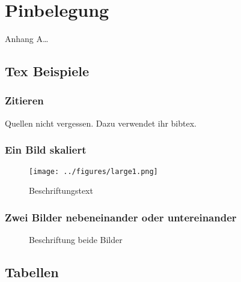 \chapter{Pinbelegung}
\label{ch:Pinbelegun}
Anhang A\ldots

\section{Tex Beispiele}
\subsection{Zitieren}
Quellen\cite{li00,jackson91,lakhina04a,netflow,rfc2386} 
nicht vergessen. Dazu verwendet ihr bibtex.


\subsection{Ein Bild skaliert}

\begin{figure}[htbp]%
	\centering
		\texttt{[image: ../figures/large1.png]}
	\caption{Beschriftungstext}
	\label{fig:large1}
\end{figure}

\subsection{Zwei Bilder nebeneinander oder untereinander}
\begin{figure*}[!htb]
	\centering
 	\caption{Beschriftung beide Bilder} 
	\label{fig:beidebilder}
\end{figure*}


\section{Tabellen}


